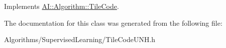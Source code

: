 Implements \hyperlink{classAI_1_1Algorithm_1_1TileCode_ad2ba639c550e7d267d066e54b20f6000}{A\+I\+::\+Algorithm\+::\+Tile\+Code}.



The documentation for this class was generated from the following file\+:\begin{DoxyCompactItemize}
\item 
Algorithms/\+Supervised\+Learning/Tile\+Code\+U\+N\+H.\+h\end{DoxyCompactItemize}
